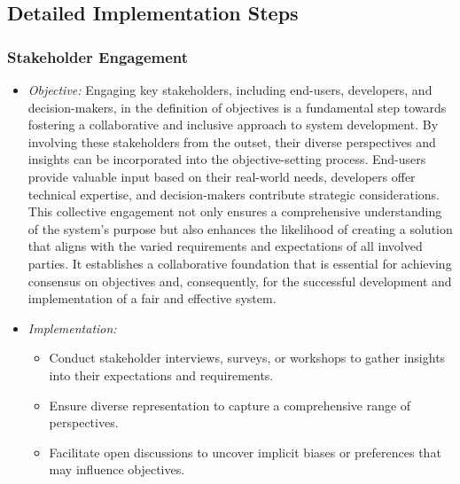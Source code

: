 \documentclass[12pt,a4paper,openright,twoside]{book}
\begin{document}
\begin{enumerate}
\begin{itemize}
        \end{itemize}

\end{enumerate}

\subsection{Detailed Implementation Steps}

\subsubsection{Stakeholder Engagement}

\begin{itemize}

    \item \emph{Objective:} Engaging key stakeholders, including end-users, developers, and decision-makers, in the definition of objectives is a fundamental step towards fostering a collaborative and inclusive approach to system development. By involving these stakeholders from the outset, their diverse perspectives and insights can be incorporated into the objective-setting process. End-users provide valuable input based on their real-world needs, developers offer technical expertise, and decision-makers contribute strategic considerations. This collective engagement not only ensures a comprehensive understanding of the system's purpose but also enhances the likelihood of creating a solution that aligns with the varied requirements and expectations of all involved parties. It establishes a collaborative foundation that is essential for achieving consensus on objectives and, consequently, for the successful development and implementation of a fair and effective system.

    \item \emph{Implementation:}

        \begin{itemize}
            
            \item Conduct stakeholder interviews, surveys, or workshops to gather insights into their expectations and requirements.
            
            \item Ensure diverse representation to capture a comprehensive range of perspectives.
            
            \item Facilitate open discussions to uncover implicit biases or preferences that may influence objectives.
        
        \end{itemize}

\end{itemize}
\end{document}
